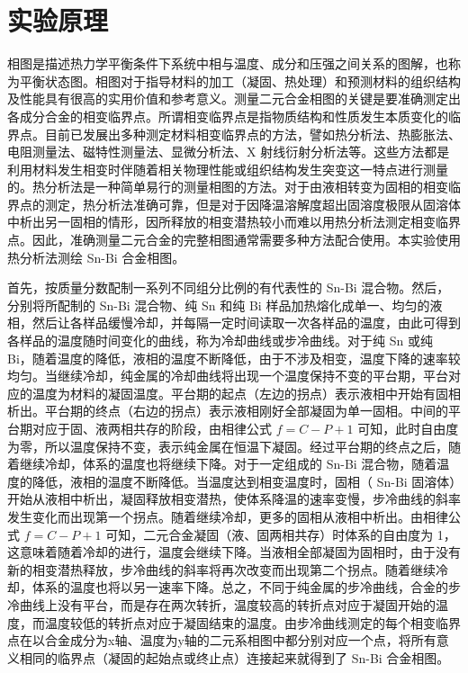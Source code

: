 \documentclass[a4paper,utf8]{article}
\begin{document}
\section{实验原理}%
    相图是描述热力学平衡条件下系统中相与温度、成分和压强之间关系的图解，也称为平衡状态图。相图对于指导材料的加工（凝固、热处理）和预测材料的组织结构及性能具有很高的实用价值和参考意义。测量二元合金相图的关键是要准确测定出各成分合金的相变临界点。所谓相变临界点是指物质结构和性质发生本质变化的临界点。目前已发展出多种测定材料相变临界点的方法，譬如热分析法、热膨胀法、电阻测量法、磁特性测量法、显微分析法、X 射线衍射分析法等。这些方法都是利用材料发生相变时伴随着相关物理性能或组织结构发生突变这一特点进行测量的。热分析法是一种简单易行的测量相图的方法。对于由液相转变为固相的相变临界点的测定，热分析法准确可靠，但是对于因降温溶解度超出固溶度极限从固溶体中析出另一固相的情形，因所释放的相变潜热较小而难以用热分析法测定相变临界点。因此，准确测量二元合金的完整相图通常需要多种方法配合使用。本实验使用热分析法测绘 Sn-Bi 合金相图。\par
    首先，按质量分数配制一系列不同组分比例的有代表性的 Sn-Bi 混合物。然后，分别将所配制的 Sn-Bi 混合物、纯 Sn 和纯 Bi 样品加热熔化成单一、均匀的液相，然后让各样品缓慢冷却，并每隔一定时间读取一次各样品的温度，由此可得到各样品的温度随时间变化的曲线，称为冷却曲线或步冷曲线。对于纯 Sn 或纯 Bi，随着温度的降低，液相的温度不断降低，由于不涉及相变，温度下降的速率较均匀。当继续冷却，纯金属的冷却曲线将出现一个温度保持不变的平台期，平台对应的温度为材料的凝固温度。平台期的起点（左边的拐点）表示液相中开始有固相析出。平台期的终点（右边的拐点）表示液相刚好全部凝固为单一固相。中间的平台期对应于固、液两相共存的阶段，由相律公式 $f=C-P+1$ 可知，此时自由度为零，所以温度保持不变，表示纯金属在恒温下凝固。经过平台期的终点之后，随着继续冷却，体系的温度也将继续下降。对于一定组成的 Sn-Bi 混合物，随着温度的降低，液相的温度不断降低。当温度达到相变温度时，固相（ Sn-Bi 固溶体）开始从液相中析出，凝固释放相变潜热，使体系降温的速率变慢，步冷曲线的斜率发生变化而出现第一个拐点。随着继续冷却，更多的固相从液相中析出。由相律公式 $f=C-P+1$ 可知，二元合金凝固（液、固两相共存）时体系的自由度为 1，这意味着随着冷却的进行，温度会继续下降。当液相全部凝固为固相时，由于没有新的相变潜热释放，步冷曲线的斜率将再次改变而出现第二个拐点。随着继续冷却，体系的温度也将以另一速率下降。总之，不同于纯金属的步冷曲线，合金的步冷曲线上没有平台，而是存在两次转折，温度较高的转折点对应于凝固开始的温度，而温度较低的转折点对应于凝固结束的温度。由步冷曲线测定的每个相变临界点在以合金成分为x轴、温度为y轴的二元系相图中都分别对应一个点，将所有意义相同的临界点（凝固的起始点或终止点）连接起来就得到了 Sn-Bi 合金相图。
    
\end{document}
